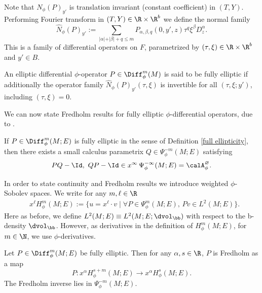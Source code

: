 Note that $N_{\phi}(P)_{y'}$ is translation invariant (constant coefficient) in $(T,Y)$.
Performing Fourier transform in $(T,Y) \in \R \times \R^b$ we define the normal family
\begin{equation}\label{normal-family}
\widehat{N}_{\phi}(P)_{y'} :=
\sum_{\vert \alpha \vert + \vert \beta \vert + q \leq m}
P_{\alpha,\beta,q}(0,y',z) \tau^q \xi^\beta D_{z}^{\alpha}.
\end{equation}
This is a family of differential operators on $F$, parametrized by
$(\tau, \xi) \in \R \times \R^b$ and $y'\in B$.
\begin{defn} \label{full ellipticity}
An elliptic differential $\phi$-operator $P \in \Diff_{\phi}^{m}(M)$ is said to be fully elliptic
if additionally the operator family $\widehat{N}_{\phi}(P)_{y'}(\tau, \xi)$
is invertible for all $(\tau, \xi; y')$, including $(\tau, \xi) = 0$.
\end{defn}

We can now state Fredholm results for fully elliptic $\phi$-differential
operators, due to \cite{mazzeo1998pseudodifferential}.

\skpt
\begin{Th}
\label{invphi}
If $ P \in\Diff^{m}_{\phi}(M; E)$ is fully elliptic
in the sense of Definition \ref{full ellipticity}, then there exists a small calculus parametrix $Q \in \Psi_{\phi}^{-m}(M;E)$
satisfying
\begin{align*}
P Q - \Id,\ Q P - \Id \in x^\infty\,\Psi_\phi^{-\infty}(M;E) = \calA_\phi^\varnothing.
\end{align*}
\end{Th}

In order to state continuity and Fredholm results we introduce weighted $\phi$-Sobolev spaces. We write
for any $m, \ell \in \R$
\begin{align*}
&x^{\ell}H^{m}_{\phi}(M;E) := \{ u = x^{\ell} \cdot v \mid \forall P \in \Psi_{\phi}^{m}(M;E),\,Pv \in L^{2}(M;E) \}.
\end{align*}
Here as before, we define $L^2(M;E) \equiv L^2(M; E; \dvol_\bb)$ with respect to the b-density $\dvol_\bb$. However, as derivatives in the definition of $H^m_\phi(M;E)$, \eg for $m\in\N$, we use $\phi$-derivatives.

\begin{Th}
Let $P\in \Diff^m_\phi(M; E)$ be fully elliptic. Then for any $\alpha, s\in\R$, $P$ is Fredholm as a map
\[
P: x^\alpha H^{s+m}_\phi(M; E) \to x^{\alpha}H^{s}_\phi(M; E).
\]
The Fredholm inverse lies in $\Psi_{\phi}^{-m}(M;E)$.
\end{Th}

